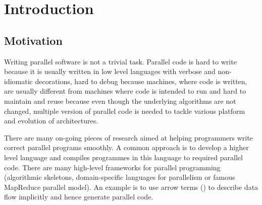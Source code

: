 \chapter{Introduction}

% 



\section{Motivation} \label{i:m}
Writing parallel software is not a trivial task. Parallel code is hard to write because it is usually written in low level languages with verbose and non-idiomatic decorations, hard to debug because machines, where code is written, are usually different from machines where code is intended to run and hard to maintain and reuse because even though the underlying algorithms are not changed, multiple version of parallel code is needed to tackle various platform and evolution of architectures.

There are many on-going pieces of research aimed at helping programmers write correct parallel programs smoothly. A common approach is to develop a higher level language and compiles programmes in this language to required parallel code. There are many high-level frameworks for parallel programming (\eg algorithmic skeletons\cite{coleAlgorithmicSkeletonsStructured}, domain-specific languages for parallelism\cite{brownHeterogeneousParallelFramework2011} or famous MapReduce parallel model\cite{liMapReduceParallelProgramming2016}). An example is to use arrow terms () to describe data flow implicitly and hence generate parallel code.

